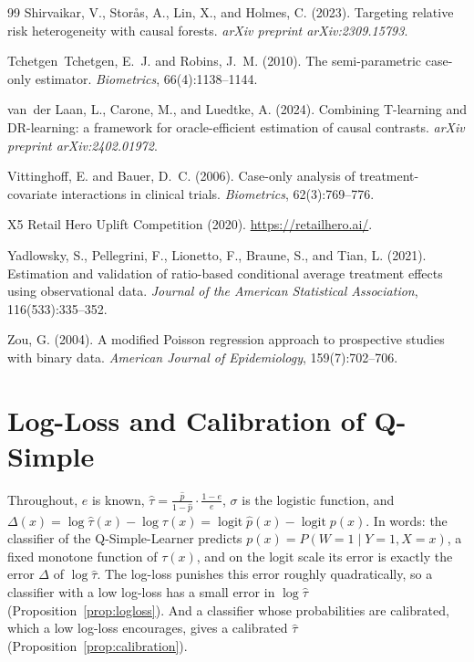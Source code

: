\documentclass{article}
\newcommand{\logit}{\operatorname{logit}}
\begin{document}
\begin{thebibliography}{99}
Shirvaikar, V., Stor{\aa}s, A., Lin, X., and Holmes, C. (2023).
Targeting relative risk heterogeneity with causal forests.
\emph{arXiv preprint arXiv:2309.15793}.

Tchetgen~Tchetgen, E.~J. and Robins, J.~M. (2010).
The semi-parametric case-only estimator.
\emph{Biometrics}, 66(4):1138--1144.

van~der Laan, L., Carone, M., and Luedtke, A. (2024).
Combining T-learning and DR-learning: a framework for oracle-efficient estimation of causal contrasts.
\emph{arXiv preprint arXiv:2402.01972}.

Vittinghoff, E. and Bauer, D.~C. (2006).
Case-only analysis of treatment-covariate interactions in clinical trials.
\emph{Biometrics}, 62(3):769--776.

X5 Retail Hero Uplift Competition (2020).
\url{https://retailhero.ai/}.

Yadlowsky, S., Pellegrini, F., Lionetto, F., Braune, S., and Tian, L. (2021).
Estimation and validation of ratio-based conditional average treatment effects using observational data.
\emph{Journal of the American Statistical Association}, 116(533):335--352.

Zou, G. (2004).
A modified Poisson regression approach to prospective studies with binary data.
\emph{American Journal of Epidemiology}, 159(7):702--706.

\end{thebibliography}

\newpage
\appendix

\section{Log-Loss and Calibration of Q-Simple}
\label{app:q-simple}

Throughout, $e$ is known, $\hat\tau=\frac{\hat p}{1-\hat p}\cdot\frac{1-e}{e}$,
$\sigma$ is the logistic function, and
$\Delta(x)=\log\hat\tau(x)-\log\tau(x)=\logit\hat p(x)-\logit p(x)$.
In words: the classifier of the Q-Simple-Learner predicts
$p(x) = P(W{=}1 \mid Y{=}1, X{=}x)$, a fixed monotone function of $\tau(x)$,
and on the logit scale its error is exactly the error $\Delta$ of
$\log\hat\tau$. The log-loss punishes this error roughly quadratically, so a
classifier with a low log-loss has a small error in $\log\hat\tau$
(Proposition~\ref{prop:logloss}). And a classifier whose probabilities are
calibrated, which a low log-loss encourages, gives a calibrated $\hat\tau$
(Proposition~\ref{prop:calibration}).
\end{document}
